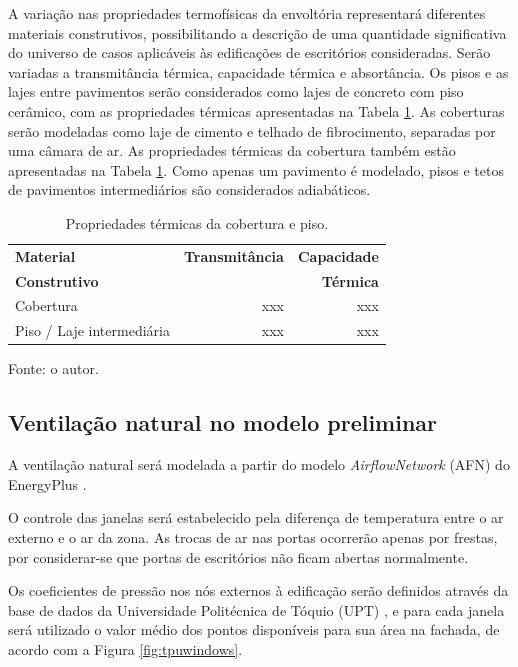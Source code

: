 \documentclass[brazil,hardcopy,openany,a5paper]{ufscthesis}
\begin{document}
		A variação nas propriedades termofísicas da envoltória representará diferentes materiais construtivos, possibilitando a descrição de uma quantidade significativa do universo de casos aplicáveis às edificações de escritórios consideradas. Serão variadas a transmitância térmica, capacidade térmica e absortância. Os pisos e as lajes entre pavimentos serão considerados como lajes de concreto com piso cerâmico, com as propriedades térmicas apresentadas na Tabela \ref{table:lajecob}. As coberturas serão modeladas como laje de cimento e telhado de fibrocimento, separadas por uma câmara de ar. As propriedades térmicas da cobertura também estão apresentadas na Tabela \ref{table:lajecob}. Como apenas um pavimento é modelado, pisos e tetos de pavimentos intermediários são considerados adiabáticos.
		
		\begin{table}[h]
			\centering
			\caption{Propriedades térmicas da cobertura e piso.}
			\label{table:lajecob}
			\begin{tabular}{|l |r |r |}
				\hline
				\textbf{Material} & \textbf{Transmitância} & \textbf{Capacidade}\\
				\textbf{Construtivo} & \textbf{ } & \textbf{Térmica}\\
				\hline
				Cobertura & xxx & xxx \\
				\hline
				Piso / Laje intermediária & xxx & xxx \\
				\hline
			\end{tabular}
			\begin{flushleft}
				Fonte: o autor.
			\end{flushleft}				
		\end{table}
		
		\subsection{Ventilação natural no modelo preliminar}
		
		A ventilação natural será modelada a partir do modelo \textit{AirflowNetwork} (AFN) do EnergyPlus \cite{EnergyPlus2018}.
		
		O controle das janelas será estabelecido pela diferença de temperatura entre o ar externo e o ar da zona. As trocas de ar nas portas ocorrerão apenas por frestas, por considerar-se que portas de escritórios não ficam abertas normalmente.
		
		Os coeficientes de pressão nos nós externos à edificação serão definidos através da base de dados da Universidade Politécnica de Tóquio (UPT) \cite{TPU2018}, e para cada janela será utilizado o valor médio dos pontos disponíveis para sua área na fachada, de acordo com a Figura \ref{fig:tpuwindows}.
		
\end{document}

